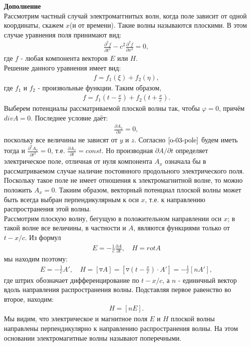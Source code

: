 \documentclass[__main__.tex]{subfiles}
\begin{document}
\textbf{Дополнение}\\
Рассмотрим частный случай электромаггнитых волн, когда поле зависит от одной координаты, скажем $x$(и от времени). Такие волны называются плоскими. В этом случае уравнения поля принимают вид:
\begin{gather}
\label{o-03-pole}
\frac{\partial^2f}{\partial t^2} - c^2\frac{\partial^2f}{\partial x^2} = 0,
\end{gather}
где $f$ - любая компонента векторов $E$ или $H$.\\ 
Решение данного уравнения имеет вид:
\begin{gather*}
f = f_1(\xi) + f_2(\eta),
\end{gather*}
где $f_1$ и $f_2$ - произвольные функции. Таким образом,
\begin{gather}
\label{o-03-f}
f = f_1(t - \frac{x}{c}) + f_2(t + \frac{x}{c}).
\end{gather}
Выберем потенциалы рассматриваемой плоской волны так, чтобы $\varphi = 0$, причём  $div A = 0$. Последнее условие даёт:
\begin{gather*}
\frac{\partial A_x}{\partial x} = 0,
\end{gather*}
поскольку все величины не зависят от $y$ и $z$. Согласно $\ref{o-03-pole}$ будем иметь тогда и $\frac{\partial^2A_x}{\partial t^2} = 0$, т.е. $\frac{\partial A_x}{\partial t} = const$. Но производная $\partial A/\partial t$ определяет электрическое поле, отличная от нуля компонента $A_x$ означала бы в рассматриваемом случае наличие постоянного продольного электрического поля. Поскольку такое поле не имеет отношения к электромагнитной волне, то можно положить $A_x = 0$.
Такиим образом, векторный потенциал плоской волны может быть всегда выбран перпендикулярным к оси $x$, т.е. к направлению распространения этой волны.\\
Рассмотрим плоскую волну, бегущую в положительном направлении оси $x$; в такой волне все величины, в частности и $A$, являются функциями только от $t - x/c$. Из формул
\begin{gather*}
E = -\frac{1}{c}\frac{\partial A}{\partial t}, \quad H = rot A
\end{gather*}
мы находим поэтому:
\begin{gather*}
E = -\frac{1}{c}A', \quad H = [\triangledown A] = [\triangledown (t - \frac{x}{c})\cdot A'] = -\frac{1}{c}[nA'],
\end{gather*}
где штрих обозначает дифференцирование по $t - x/c$, а $n$ - единичный вектор вдоль направления распространения волны. Подставляя первое равенство во второе, находим:
\begin{gather}
\label{o-03-H}
H = [nE].
\end{gather}
Мы видим, что электрическое и магнитное поля $E$ и $H$ плоской волны направлены перпендикулярно к направлению распространения волны. На этом основании электромагитные волны называют поперечными.\\
\end{document}
